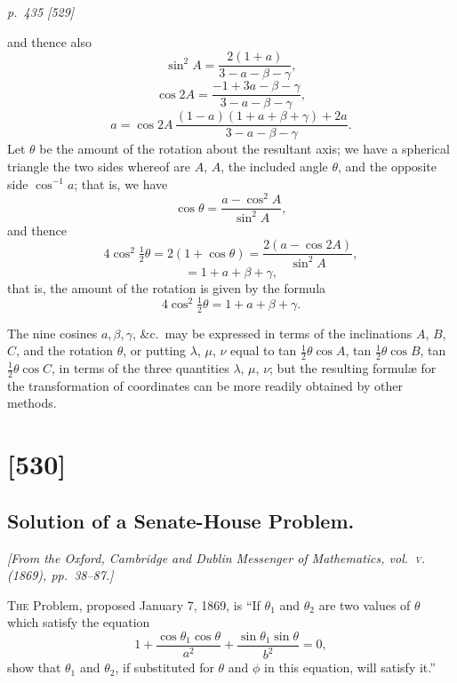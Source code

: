 \documentclass[11pt,a4paper]{book}
\begin{document}
\clearpage

\bigskip
\textit{p.~435 [529]}
\smallskip

\noindent
and thence also
\[
\sin^2 A = \frac{2(1 + a)}{3 - a - \beta - \gamma},
\]
\[
\cos 2A = \frac{- 1 + 3a - \beta - \gamma}{3 - a - \beta - \gamma},
\]
\[
a = \cos 2A\,\frac{(1 - a)(1 + a + \beta + \gamma) + 2a}{3 - a - \beta - \gamma}.
\]
Let $\theta$ be the amount of the rotation about the resultant axis; we have a spherical
triangle the two sides whereof are $A$, $A$, the included angle $\theta$, and the opposite side
$\cos^{-1} a$; that is, we have
\[
\cos\theta = \frac{a - \cos^2 A}{\sin^2 A},
\]
and thence
\[
4\cos^2\tfrac{1}{2}\theta = 2(1 + \cos\theta) = \frac{2(a - \cos 2A)}{\sin^2 A},
\]
\[
= 1 + a + \beta + \gamma,
\]
that is, the amount of the rotation is given by the formula
\[
4\cos^2\tfrac{1}{2}\theta = 1 + a + \beta + \gamma.
\]

The nine cosines $a, \beta, \gamma$, \&c.\ may be expressed in terms of the inclinations $A$, $B$, $C$,
and the rotation $\theta$, or putting $\lambda$, $\mu$, $\nu$ equal to tan $\tfrac{1}{2}\theta\cos A$, tan $\tfrac{1}{2}\theta\cos B$, tan $\tfrac{1}{2}\theta\cos C$,
in terms of the three quantities $\lambda$, $\mu$, $\nu$; but the resulting formul\ae{} for the transformation of coordinates can be more readily obtained by other methods.

\clearpage

\section{[530]}
\subsection{Solution of a Senate-House Problem.}

\begin{center}
\textit{[From the Oxford, Cambridge and Dublin Messenger of Mathematics, vol.~\textsc{v}. (1869), pp.~38--87.]}
\end{center}

\textsc{The} Problem, proposed January 7, 1869, is ``If $\theta_1$ and $\theta_2$ are two values of $\theta$
which satisfy the equation
\[
1 + \frac{\cos\theta_1\cos\theta}{a^2} + \frac{\sin\theta_1\sin\theta}{b^2} = 0,
\]
show that $\theta_1$ and $\theta_2$, if substituted for $\theta$ and $\phi$ in this equation, will satisfy it.''
\end{document}
